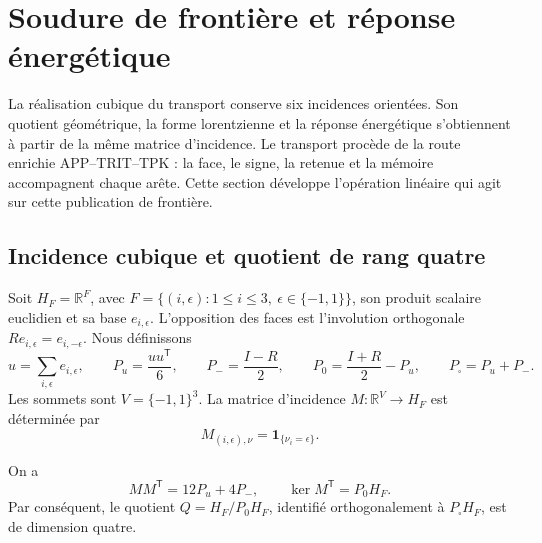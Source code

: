 
\section{Soudure de frontière et réponse énergétique}
\label{vii:vii:sec:pantalla-respuesta}

La réalisation cubique du transport conserve six incidences orientées.
Son quotient géométrique, la forme lorentzienne et la réponse énergétique
s'obtiennent à partir de la même matrice d'incidence. Le transport procède de
la route enrichie APP--TRIT--TPK : la face, le signe, la retenue et la
mémoire accompagnent chaque arête. Cette section développe
l'opération linéaire qui agit sur cette publication de frontière.

\subsection{Incidence cubique et quotient de rang quatre}
\label{vii:vii:sec:cociente-pantalla}

Soit \(H_F=\mathbb R^F\), avec
\(F=\{(i,\epsilon):1\leq i\leq3,\ \epsilon\in\{-1,1\}\}\),
son produit scalaire euclidien et sa base \(e_{i,\epsilon}\).
L'opposition des faces est l'involution orthogonale
\(Re_{i,\epsilon}=e_{i,-\epsilon}\). Nous définissons
\[
 u=\sum_{i,\epsilon}e_{i,\epsilon},\qquad
 P_u=\frac{uu^{\mathsf T}}6,\qquad P_-=\frac{I-R}{2},\qquad
 P_0=\frac{I+R}{2}-P_u,\qquad P_\square=P_u+P_-.
\]
Les sommets sont \(V=\{-1,1\}^3\). La matrice d'incidence \(M:\mathbb R^V\longrightarrow H_F\) est déterminée par
\[
 M_{(i,\epsilon),\nu}=\mathbf1_{\{\nu_i=\epsilon\}}.
\]

\begin{proposition}
\label{vii:vii:prop:incidencia}
On a
\[
 MM^{\mathsf T}=12P_u+4P_-,
 \qquad
 \ker M^{\mathsf T}=P_0H_F.
\]
Par conséquent, le quotient
\(Q=H_F/P_0H_F\), identifié orthogonalement à
\(P_\square H_F\), est de dimension quatre.
\end{proposition}

